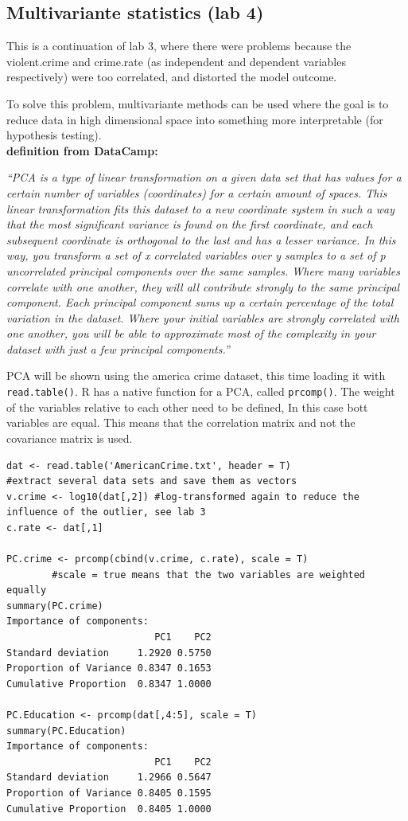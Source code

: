 \documentclass{article}
\begin{document}
\subsection{Multivariante statistics (lab 4)}
This is a continuation of lab 3, where there were problems because the violent.crime and crime.rate (as independent and dependent variables respectively) were too correlated, and distorted the model outcome. \par 
To solve this problem, multivariante methods can be used where the goal is to reduce data in high dimensional space into something more interpretable (for hypothesis testing).  \\
\textbf{definition from DataCamp:}\\
\begin{small}
\begin{center}
\textit{“PCA is a type of linear transformation on a given data set that has values
for a certain number of variables (coordinates) for a certain amount of
spaces. This linear transformation fits this dataset to a new coordinate
system in such a way that the most significant variance is found on the first
coordinate, and each subsequent coordinate is orthogonal to the last and
has a lesser variance. In this way, you transform a set of x correlated
variables over y samples to a set of p uncorrelated principal components
over the same samples. Where many variables correlate with one another,
they will all contribute strongly to the same principal component.
Each principal component sums up a certain percentage of the total
variation in the dataset. Where your initial variables are strongly
correlated with one another, you will be able to approximate most of the
complexity in your dataset with just a few principal components.”}
\end{center}
\end{small} 
PCA will be shown using the america crime dataset, this time loading it with \texttt{read.table()}. R has a native function for a PCA, called  \texttt{prcomp()}. The weight of the variables relative to each other need to be defined, In this case bott variables are equal. This means that the correlation matrix and not the covariance matrix is used.

\begin{lstlisting}
dat <- read.table('AmericanCrime.txt', header = T)
#extract several data sets and save them as vectors
v.crime <- log10(dat[,2]) #log-transformed again to reduce the influence of the outlier, see lab 3
c.rate <- dat[,1]

PC.crime <- prcomp(cbind(v.crime, c.rate), scale = T)
        #scale = true means that the two variables are weighted equally
summary(PC.crime) 
Importance of components:
                          PC1    PC2
Standard deviation     1.2920 0.5750
Proportion of Variance 0.8347 0.1653
Cumulative Proportion  0.8347 1.0000

PC.Education <- prcomp(dat[,4:5], scale = T)
summary(PC.Education)
Importance of components:
                          PC1    PC2
Standard deviation     1.2966 0.5647
Proportion of Variance 0.8405 0.1595
Cumulative Proportion  0.8405 1.0000
\end{lstlisting}
\end{document}
